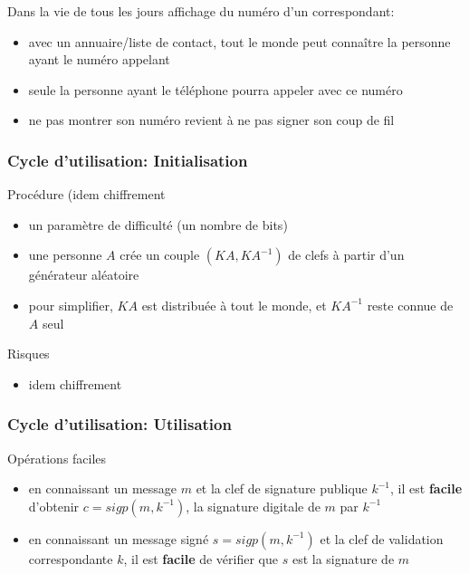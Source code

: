 \begin{reveals}
\begin{frame}
  \vfill

  \begin{block}{Dans la vie de tous les jours}
    affichage du numéro d'un correspondant:
    \begin{itemize}
    \item avec un annuaire/liste de contact, tout le monde peut
      connaître la personne ayant le numéro appelant
    \item seule la personne ayant le téléphone pourra appeler avec ce
      numéro
    \item ne pas montrer son numéro revient à ne pas signer son coup de fil
    \end{itemize}
  \end{block}

  \vfill


\end{frame}


\begin{frame}
  \frametitle{Cycle d'utilisation: Initialisation}

  \vfill

  \begin{block}{Procédure (idem chiffrement}
    \begin{itemize}
    \item un paramètre de difficulté (un nombre de bits)
    \item une personne \(A\) crée un couple \((KA,KA^{-1})\) de clefs
      à partir d'un générateur aléatoire
    \item pour simplifier, \(KA\) est distribuée à tout le monde, et
      \(KA^{-1}\) reste connue de \(A\) seul
    \end{itemize}
  \end{block}

  \vfill

  \begin{block}{Risques}
    \begin{itemize}
    \item idem chiffrement
    \end{itemize}
  \end{block}

  \vfill

\end{frame}


\begin{frame}
  \frametitle{Cycle d'utilisation: Utilisation}

  \vfill

  \begin{block}{Opérations faciles}
    \begin{itemize}
    \item en connaissant un message \(m\) et la clef de signature
      publique \(k^{-1}\), il est \textbf{facile} d'obtenir
      \(c=sigp(m,k^{-1})\), la signature digitale de \(m\) par
      \(k^{-1}\)
    \item en connaissant un message signé \(s=sigp(m,k^{-1})\) et la
      clef de validation correspondante \(k\), il est \textbf{facile} de
      vérifier que \(s\) est la signature de \(m\)
    \end{itemize}
  \end{block}


\end{frame}
\end{reveals}
